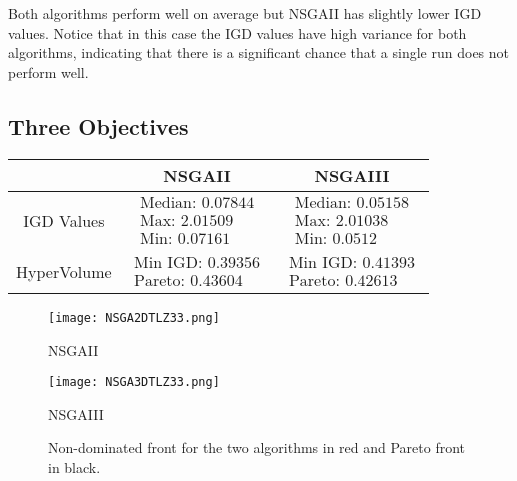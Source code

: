 \documentclass[a4paper,11pt]{article}
\numberwithin{equation}{section}
\begin{document}
\noindent Both algorithms perform well on average but NSGAII has slightly lower IGD values. Notice that in this case the IGD values have high variance for both algorithms, indicating that there is a significant chance that a single run does not perform well. 

\newpage

\subsection{Three Objectives}

\begin{table}[!h]
\begin{center}
\begin{tabular}{|c|c|c|}
\hline
 & NSGAII & NSGAIII \\
\hline
IGD Values &$\begin{array}{l}
\text{Median: 0.07844}\\
\text{Max: 2.01509}\\
\text{Min: 0.07161}\end{array}$&
$\begin{array}{l}
\text{Median: 0.05158}\\
\text{Max: 2.01038}\\
\text{Min: 0.0512}\end{array}$\\
\hline
HyperVolume &$\begin{array}{l}
\text{Min IGD: 0.39356}\\
\text{Pareto: 0.43604}\end{array}$&
$\begin{array}{l}
\text{Min IGD: 0.41393}\\
\text{Pareto: 0.42613}\end{array}$\\
\hline
\end{tabular}
\end{center}
\end{table}

\begin{figure}[h]
        \centering
        \begin{minipage}{0.48\textwidth} 
            \centering
            \texttt{[image: NSGA2DTLZ33.png]} 
            \caption*{NSGAII}
        \end{minipage}
        \hfill
        \begin{minipage}{0.48\textwidth} 
            \centering
            \texttt{[image: NSGA3DTLZ33.png]} 
            \caption*{NSGAIII} 
        \end{minipage}
        \caption{Non-dominated front for the two algorithms in red and Pareto front in black. } 
    \end{figure}
\end{document}

